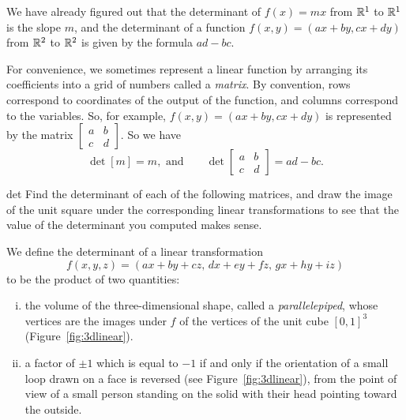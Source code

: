 \documentclass{watsonbook}
\begin{document}
We have already figured out that the determinant of $f(x) = mx$ from
$\mathbb{R}^1$ to $\mathbb{R}^1$ is the slope $m$, and the determinant of a function
$f(x,y) = (ax + by, cx + dy)$ from $\mathbb{R}^2$ to $\mathbb{R}^2$ is given by the
formula $ad - bc$.

For convenience, we sometimes represent a linear function by arranging
its coefficients into a grid of numbers called a \textit{matrix}. By
convention, rows correspond to coordinates of the output of the
function, and columns correspond to the variables. So, for example,
$f(x,y) = (ax + by, cx + dy)$ is represented by the matrix
$\left[\begin{array}{cc} a & b \\ c & d \end{array}\right]$. So we
have
\[
  \det [m] = m, \text{ and} \qquad \det \left[\begin{array}{cc} a & b \\ c & d \end{array}\right] = ad - bc. 
\]

\begin{exercise}{}{det}
  Find the determinant of each of the following matrices, and draw the
  image of the unit square under the corresponding linear
  transformations to see that the value of the determinant you
  computed makes sense.

  \pairofprobs{$\left[\begin{array}{cc} 1 & 0 \\ 0 & -1 \end{array}\right]$}{
    $\left[\begin{array}{cc} 2 & 1 \\ 0 & 2 \end{array}\right]$}

  \pairofprobs{$\left[\begin{array}{cc} 0 & 1 \\ -1 & 0 \end{array}\right]$}{
    $\left[\begin{array}{cc} 2 & 1  \\ 4 & 2 \end{array}\right]$}
\end{exercise}

We define the determinant of a linear transformation 
\[
  f(x,y,z) = (ax + by + cz, \, dx + ey + fz,\, gx + hy  + iz)
\]
to be the product of two quantities:
\begin{enumerate}[(i),topsep=-6pt]
  \item the volume of the three-dimensional shape, called a
    \textit{parallelepiped}, whose vertices are the images under $f$
    of the vertices of the unit cube $[0,1]^3$
    (Figure~\ref{fig:3dlinear}).
  \item a factor of
    $\pm1$ which is equal to $-1$ if and only if the orientation of a
    small loop drawn on a face is reversed (see
    Figure~\ref{fig:3dlinear}), from the point of view of a small
    person standing on the solid with their head pointing toward the
    outside.
\end{enumerate}
\end{document}
